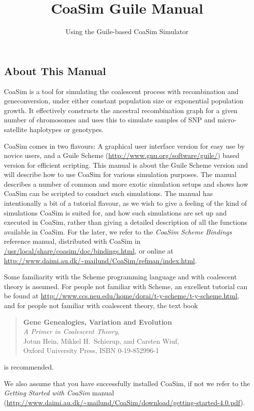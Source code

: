 \documentclass{manual}
\title{CoaSim Guile Manual}
\subtitle{Using the Guile-based CoaSim Simulator}
\begin{document}
\begin{empfile}


\section{About This Manual}
\label{sec:about-this-manual}

CoaSim is a tool for simulating the coalescent process with
recombination and geneconversion, under either constant population
size or exponential population growth.  It effectively constructs the
ancestral recombination graph for a given number of chromosomes and
uses this to simulate samples of SNP and micro-satellite haplotypes or
genotypes.

CoaSim comes in two flavours: A graphical user interface version for
easy use by novice users, and a Guile Scheme
(\url{http://www.gnu.org/software/guile/}) based version for efficient
scripting.  This manual is about the Guile Scheme version and will
describe how to use CoaSim for various simulation purposes.  The
manual describes a number of common and more exotic simulation setups
and shows how CoaSim can be scripted to conduct such simulations.  The
manual has intentionally a bit of a tutorial flavour, as we wish to
give a feeling of the kind of simulations CoaSim is suited for, and
how such simulations are set up and executed in CoaSim, rather than
giving a detailed description of all the functions available in
CoaSim.  For the later, we refer to the \emph{CoaSim Scheme Bindings}
reference manual, distributed with CoaSim in
\url{/usr/local/share/coasim/doc/bindings.html}, or online at
\url{http://www.daimi.au.dk/~mailund/CoaSim/refman/index.html}.

Some familiarity with the Scheme programming language and with
coalescent theory is assumed.  For people not familiar with Scheme, an
excellent tutorial can be found at
\url{http://www.ccs.neu.edu/home/dorai/t-y-scheme/t-y-scheme.html},
and for people not familiar with coalescent theory, the text book
\begin{quote}
  \textbf{Gene Genealogies, Variation and Evolution}\\
  \textit{A Primer in Coalescent Theory},\\
  Jotun Hein, Mikkel H.\ Schierup, and Carsten Wiuf,\\
  Oxford University Press, ISBN 0-19-852996-1  
\end{quote}
is recommended.

We also assume that you have successfully installed CoaSim, if not we
refer to the \emph{Getting Started with CoaSim} manual (\url{http://www.daimi.au.dk/~mailund/CoaSim/download/getting-started-4.0.pdf}).



\end{empfile}
\end{document}

